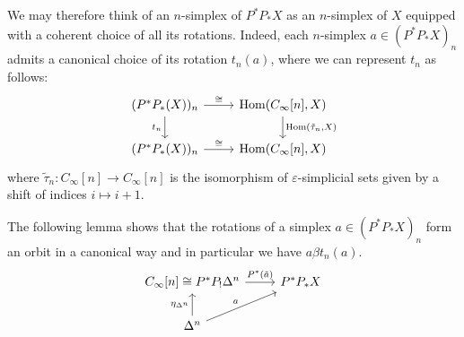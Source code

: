 \documentclass{article}
\theoremstyle{plain}
\theoremstyle{definition}
\theoremstyle{remark}
\begin{document}
We may therefore think of an $n$-simplex of $P^*P_*X$ as an
$n$-simplex of $X$ equipped with a coherent choice of all its rotations. Indeed, each $n$-simplex
\(a\in (P^*P_*X)_n\) admits a canonical choice of its rotation $t_n(a)$, where we can represent $t_n$ as follows:
\begin{equation}\label{diag:canonicalRot}
    \begin{tikzcd}
        (P^*P_*(X))_n\arrow[r,"\cong"]\arrow[d,"{t_n}"']&\mathrm{Hom}(C_\infty[n],X)\arrow[d,"{\mathrm{Hom}(\tilde{\tau}_n,X)}"]\\
        (P^*P_*(X))_n\arrow[r,"\cong"]&\mathrm{Hom}(C_\infty[n],X)
    \end{tikzcd}
\end{equation}
where $\tilde{\tau}_n\colon C_\infty[n]\rightarrow C_\infty[n]$ is the isomorphism of $\varepsilon$-simplicial sets given by a shift of indices $i\mapsto i+1$.

The following lemma shows that the rotations of a simplex $a\in (P^*P_*X)_n$ form an orbit in a canonical way and in particular we have $a \beta t_n(a)$.
\begin{equation}
    \begin{tikzcd}
        {C_\infty[n]\cong P^*P_!\Delta^n}\arrow[r,"P^*(\tilde{a})"]&{P^*P_*X}\\
        {\Delta^n}\arrow[u,"\eta_{\Delta^n}"]\arrow[ru,"a"]&
    \end{tikzcd}
\end{equation}
\end{document}
